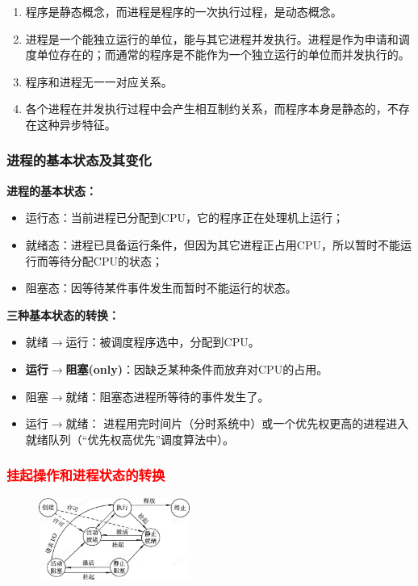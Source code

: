 \documentclass{article}
\begin{document}
\begin{enumerate}
    \item 程序是静态概念，而进程是程序的一次执行过程，是动态概念。
    \item 进程是一个能独立运行的单位，能与其它进程并发执行。进程是作为申请和调度单位存在的；而通常的程序是不能作为一个独立运行的单位而并发执行的。
    \item 程序和进程无一一对应关系。
    \item 各个进程在并发执行过程中会产生相互制约关系，而程序本身是静态的，不存在这种异步特征。
\end{enumerate}

\subsubsection{{\color{red}进程的基本状态及其变化}}
\noindent\textbf{进程的基本状态：}
\begin{itemize}
    \item 运行态：当前进程已分配到CPU，它的程序正在处理机上运行；
    \item 就绪态：进程已具备运行条件，但因为其它进程正占用CPU，所以暂时不能运行而等待分配CPU的状态；
    \item 阻塞态：因等待某件事件发生而暂时不能运行的状态。
\end{itemize}
\textbf{三种基本状态的转换：}
\begin{itemize}
\item 就绪$\rightarrow$运行：被调度程序选中，分配到CPU。
\item \textbf{运行$\rightarrow$阻塞(only)}：因缺乏某种条件而放弃对CPU的占用。
\item 阻塞$\rightarrow$就绪：阻塞态进程所等待的事件发生了。
\item 运行$\rightarrow$就绪： 进程用完时间片（分时系统中）或一个优先权更高的进程进入就绪队列（“优先权高优先”调度算法中）。
\end{itemize}

\subsubsection{\textcolor{red}{挂起操作和进程状态的转换}}

\begin{figure}
    \centering
    \includegraphics[width=0.44\textwidth,trim=0 20 0 20,clip]{进程状态.png}
\end{figure}
\end{document}
